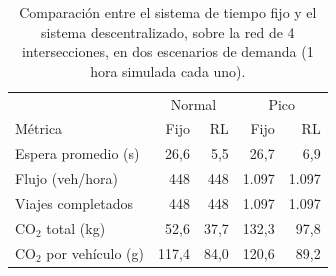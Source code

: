 \begin{table}[ht]
\centering
\caption{Comparación entre el sistema de tiempo fijo y el sistema descentralizado, sobre la red de 4 intersecciones, en dos escenarios de demanda (1 hora simulada cada uno).}
\label{tab:resultados}
\begin{tabular}{lrrrr}
\hline
 & \multicolumn{2}{c}{Normal} & \multicolumn{2}{c}{Pico} \\
Métrica & Fijo & RL & Fijo & RL \\
\hline
Espera promedio (s) & 26,6 & 5,5 & 26,7 & 6,9 \\
Flujo (veh/hora) & 448 & 448 & 1.097 & 1.097 \\
Viajes completados & 448 & 448 & 1.097 & 1.097 \\
CO$_2$ total (kg) & 52,6 & 37,7 & 132,3 & 97,8 \\
CO$_2$ por vehículo (g) & 117,4 & 84,0 & 120,6 & 89,2 \\
\hline
\end{tabular}
\end{table}
